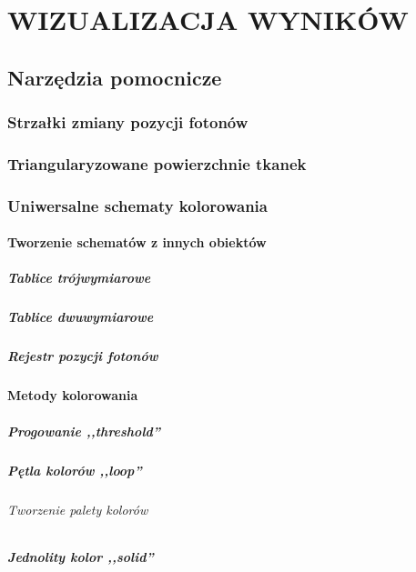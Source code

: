 \chapter{WIZUALIZACJA WYNIKÓW}
\label{chpt:wizualizacja-wyników}
\section{Narzędzia pomocnicze}
\subsection{Strzałki zmiany pozycji fotonów}
\subsection{Triangularyzowane powierzchnie tkanek}
\subsection{Uniwersalne schematy kolorowania}
\subsubsection{Tworzenie schematów z innych obiektów}
\paragraph{Tablice trójwymiarowe}
\paragraph{Tablice dwuwymiarowe}
\paragraph{Rejestr pozycji fotonów}
\subsubsection{Metody kolorowania}
\paragraph{Progowanie ,,threshold''}
\paragraph{Pętla kolorów ,,loop''}
\subparagraph{Tworzenie palety kolorów}
\paragraph{Jednolity kolor ,,solid''}
